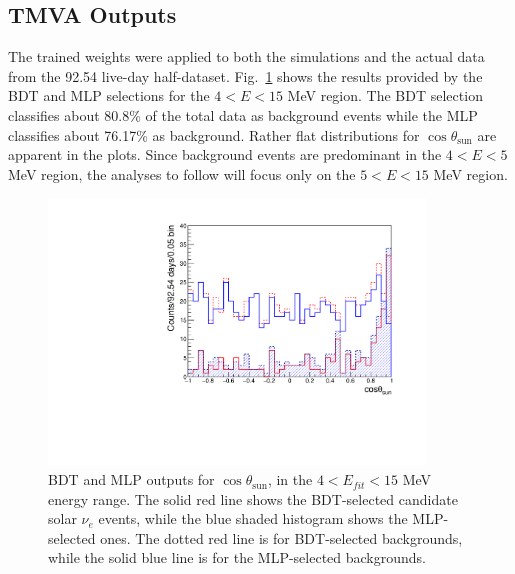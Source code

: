 
%

\subsection{TMVA Outputs}

The trained weights were applied to both the simulations and the actual data from the 92.54 live-day half-dataset.  Fig.~\ref{fig:cosThetaToSun_4to15_output} shows the results provided by the BDT and MLP selections for the $4<E<15$ MeV region. The BDT selection classifies about 80.8\% of the total data as background events while the MLP classifies about 76.17\% as background. Rather flat distributions for  $\cos\theta_\mathrm{sun}$ are apparent in the plots. Since background events are predominant in the $4<E<5$ MeV region, the analyses to follow will focus only on the $5<E<15$ MeV region.

\begin{figure}[!htb]
	\centering
	\includegraphics[width=10cm]{cosThetaToSun_4to15_output.pdf}
	\caption[BDT and MLP outputs for the $\cos\theta_\mathrm{sun}$ ($4<E_{fit}<15$ MeV).]{BDT and MLP outputs for $\cos\theta_\mathrm{sun}$, in the $4<E_{fit}<15$ MeV energy range. The solid red line shows the BDT-selected candidate solar $\nu_e$ events, while the blue shaded histogram shows the MLP-selected ones. The dotted red line is for BDT-selected backgrounds, while the solid blue line is for the MLP-selected backgrounds.\label{fig:cosThetaToSun_4to15_output}}
\end{figure}

